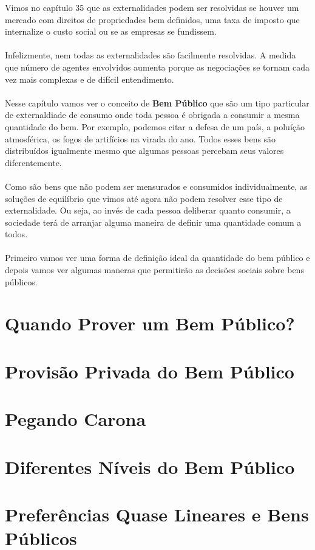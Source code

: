 \documentclass[a4paper,11pt,oneside]{book}
\theoremstyle{definition}
\theoremstyle{break}
\begin{document}
Vimos no capítulo 35 que as externalidades podem ser resolvidas se houver um mercado com direitos de propriedades bem definidos, uma taxa de imposto que internalize o custo social ou se as empresas se fundissem.
\\~\\ 
Infelizmente, nem todas as externalidades são facilmente resolvidas. A medida que número de agentes envolvidos aumenta porque as negociações se tornam cada vez mais complexas e de difícil entendimento.
\\~\\
Nesse capítulo vamos ver o conceito de \textbf{Bem Público} que são um tipo particular de externaldiade de consumo onde toda pessoa é obrigada a consumir a mesma quantidade do bem. Por exemplo, podemos citar a defesa de um país, a poluíção atmosférica, os fogos de artifícios na virada do ano. Todos esses bens são distribuídos igualmente mesmo que algumas pessoas percebam seus valores diferentemente.
\\~\\
Como são bens que não podem ser mensurados e consumidos individualmente, as soluções de equilíbrio que vimos até agora não podem resolver esse tipo de externalidade. Ou seja, ao invés de cada pessoa deliberar quanto consumir, a sociedade terá de arranjar alguma maneira de definir uma quantidade comum a todos.
\\~\\
Primeiro vamos ver uma forma de definição ideal da quantidade do bem público e depois vamos ver algumas maneras que permitirão as decisões sociais sobre bens públicos.

\section{Quando Prover um Bem Público?}
\section{Provisão Privada do Bem Público}
\section{Pegando Carona}
\section{Diferentes Níveis do Bem Público}
\section{Preferências Quase Lineares e Bens Públicos}
\end{document}
